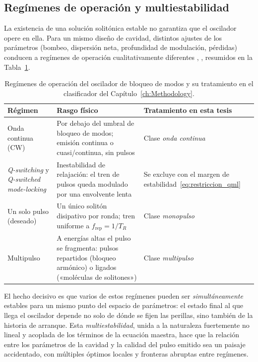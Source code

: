 \subsection{Regímenes de operación y multiestabilidad}
\label{sec:regimenes}

La existencia de una solución solitónica estable no garantiza que el oscilador
opere en ella. Para un mismo diseño de cavidad, distintos ajustes de los
parámetros (bombeo, dispersión neta, profundidad de modulación, pérdidas) conducen
a regímenes de operación cualitativamente diferentes
\cite{GreluAkhmediev2012}, \cite[sec.~9.7]{Keller2022}, resumidos en la
Tabla~\ref{tab:regimenes}.

\begin{table}[h]
    \centering
    \small
    \caption{Regímenes de operación del oscilador de bloqueo de modos y su tratamiento en el clasificador del Capítulo~\ref{ch:Methodology}.}
    \label{tab:regimenes}
    \begin{tabular}{p{} p{} p{}}
        \toprule
        Régimen & Rasgo físico & Tratamiento en esta tesis \\
        \midrule
        Onda continua (CW) & Por debajo del umbral de bloqueo de modos; emisión continua o cuasi\-/continua, sin pulsos & Clase \emph{onda continua} \\
        \emph{Q-switching} y \emph{Q-switched mode-locking} & Inestabilidad de relajación: el tren de pulsos queda modulado por una envolvente lenta & Se excluye con el margen de estabilidad~\eqref{eq:restriccion_qml} \\
        Un solo pulso (deseado) & Un único solitón disipativo por ronda; tren uniforme a $f_{\text{rep}}=1/T_R$ & Clase \emph{monopulso} \\
        Multipulso & A energías altas el pulso se fragmenta: pulsos repartidos (bloqueo armónico) o ligados («moléculas de solitones») & Clase \emph{multipulso} \\
        \bottomrule
    \end{tabular}
\end{table}

El hecho decisivo es que varios de estos regímenes pueden ser
\emph{simultáneamente} estables para un mismo punto del espacio de parámetros: el
estado final al que llega el oscilador depende no solo de dónde se fijen las
perillas, sino también de la historia de arranque. Esta \emph{multiestabilidad},
unida a la naturaleza fuertemente no lineal y acoplada de los términos de la
ecuación maestra, hace que la relación entre los parámetros de la cavidad y la
calidad del pulso emitido sea un paisaje accidentado, con múltiples óptimos locales
y fronteras abruptas entre regímenes.



